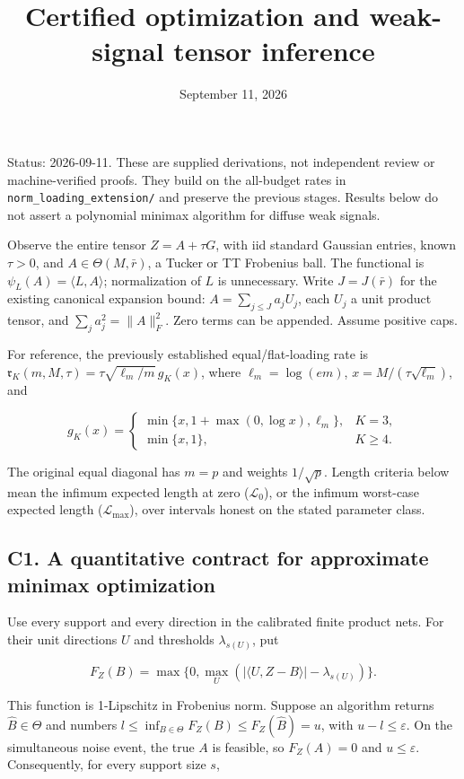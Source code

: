 \documentclass[
  10pt,
]{article}
\title{Certified optimization and weak-signal tensor inference}
\author{}
\date{September 11, 2026}
\begin{document}
\maketitle

Status: 2026-09-11. These are supplied derivations, not independent
review or machine-verified proofs. They build on the all-budget rates in
\texttt{norm\_loading\_extension/} and preserve the previous stages.
Results below do not assert a polynomial minimax algorithm for diffuse
weak signals.

Observe the entire tensor \(Z=A+\tau G\), with iid standard Gaussian
entries, known \(\tau>0\), and \(A\in\Theta(M,\bar r)\), a Tucker or TT
Frobenius ball. The functional is \(\psi_L(A)=\langle L,A\rangle\);
normalization of \(L\) is unnecessary. Write \(J=J(\bar r)\) for the
existing canonical expansion bound: \(A=\sum_{j\le J}a_j U_j\), each
\(U_j\) a unit product tensor, and \(\sum_j a_j^2=\|A\|_F^2\). Zero
terms can be appended. Assume positive caps.

For reference, the previously established equal/flat-loading rate is
\(\mathfrak r_K(m,M,\tau)=\tau\sqrt{\ell_m/m}\,g_K(x)\), where
\(\ell_m=\log(em)\), \(x=M/(\tau\sqrt{\ell_m})\), and

\[g_K(x)=\begin{cases}
\min\{x,1+\max(0,\log x),\ell_m\},&K=3,\\
\min\{x,1\},&K\ge4.
\end{cases}\]

The original equal diagonal has \(m=p\) and weights \(1/\sqrt p\).
Length criteria below mean the infimum expected length at zero
(\(\mathcal L_0\)), or the infimum worst-case expected length
(\(\mathcal L_{\max}\)), over intervals honest on the stated parameter
class.

\subsection{C1. A quantitative contract for approximate minimax
optimization}\label{c1.-a-quantitative-contract-for-approximate-minimax-optimization}

Use every support and every direction in the calibrated finite product
nets. For their unit directions \(U\) and thresholds \(\lambda_{s(U)}\),
put

\[F_Z(B)=\max\{0,\max_U(|\langle U,Z-B\rangle|-\lambda_{s(U)})\}.\]

This function is 1-Lipschitz in Frobenius norm. Suppose an algorithm
returns \(\widehat B\in\Theta\) and numbers
\(l\le\inf_{B\in\Theta}F_Z(B)\le
F_Z(\widehat B)=u\), with \(u-l\le\varepsilon\). On the simultaneous
noise event, the true \(A\) is feasible, so \(F_Z(A)=0\) and
\(u\le\varepsilon\). Consequently, for every support size \(s\),
\end{document}
